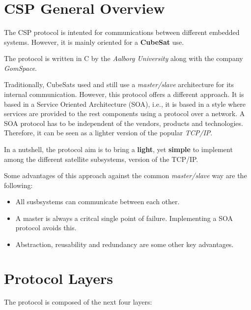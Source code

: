 \section{CSP General Overview \cite{GomSpace}}
	\paragraph{}
	The CSP protocol is intented for communications between different embedded systems. However, it is mainly oriented for a \textbf{CubeSat} use.
	\newline
	
	The protocol is written in C by the\textit{ Aalborg University} along with the company \textit{GomSpace}.
	\newline
	
	Traditionally, CubeSats used and still use a \textit{master/slave} architecture for its internal communication. However, this protocol offers a different approach. It is based in a Service Oriented Architecture (SOA), i.e., it is based in a style where services are provided to the rest components using a protocol over a network. A SOA protocol has to be independent of the vendors, products and technologies.  Therefore, it can be seen as a lighter version of the popular \textit{TCP/IP}.
	\newline
	
	In a nutshell, the protocol aim is to bring a \textbf{light}, yet \textbf{simple} to implement among the different satellite subsystems, version of the TCP/IP.
	\newline
	
	Some advantages of this approach against the common \textit{master/slave} way are the following:
	\begin{itemize}
		\item All susbsystems can communicate between each other.
		\item A master is always a critcal single point of failure. Implementing a SOA protocol avoids this.
		
		\item Abstraction, reusability and redundancy are some other key advantages.
	\end{itemize}
	
\section{Protocol Layers \cite{KubOS}}
The protocol is composed of the next four layers:


